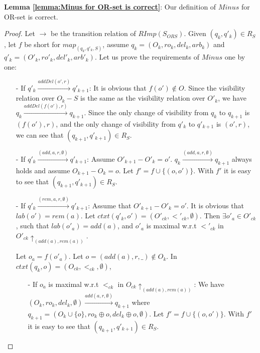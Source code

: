 {\noindent \bf Lemma \ref{lemma:Minus for OR-set is correct}}: Our definition of $Minus$ for OR-set is correct.

\begin {proof}

Let $\rightarrow$ be the transition relation of $RImp(S_{\mathit{ORS}})$. Given $(q_k,q'_k) \in R_{S}$, let $f$ be short for $map_{(q_k,q'_k,S)}$, assume $q_k = (O_k,\mathit{ro}_k,\mathit{del}_k,\mathit{arb}_k)$ and $q'_k = (O'_k,\mathit{ro}'_k,\mathit{del}'_k,\mathit{arb}'_k)$. Let us prove the requirements of $Minus$ one by one:

\begin{itemize}
\setlength{\itemsep}{0.5pt}
\item[-] If $q'_k {\xrightarrow{addDel(o',r)}} q'_{k+1}$: It is obvious that $f(o') \notin O$. Since the visibility relation over $O_k - S$ is the same as the visibility relation over $O'_k$, we have $q_k {\xrightarrow{addDel(f(o'),r)}} q_{k+1}$. Since the only change of visibility from $q_k$ to $q_{k+1}$ is $(f(o'),r)$, and the only change of visibility from $q'_k$ to $q'_{k+1}$ is $(o',r)$, we can see that $(q_{k+1},q'_{k+1}) \in R_{S}$.

\item[-] If $q'_k {\xrightarrow{(add,a,r,\emptyset)}} q'_{k+1}$: Assume $O'_{k+1} - O'_k = o'$. $q_k {\xrightarrow{(add,a,r,\emptyset)}} q_{k+1}$ always holds and assume $O_{k+1} - O_k = o$. Let $f' = f \cup \{ (o,o') \}$. With $f'$ it is easy to see that $(q_{k+1},q'_{k+1}) \in R_{S}$.

\item[-] If $q'_k {\xrightarrow{(rem,a,r,\emptyset)}} q'_{k+1}$: Assume that $O'_{k+1} - O'_k = o'$. It is obvious that $lab(o') = rem(a)$. Let $ctxt(q'_k,o') = (O'_{ck},<'_{ck},\emptyset)$. Then $\exists o'_a \in O'_{ck}$, such that $lab(o'_a) = add(a)$, and $o'_a$ is maximal w.r.t $<'_{ck}$ in $O'_{ck} \uparrow_{ (add(a),rem(a)) }$.

    Let $o_a = f(o'_a)$. Let $o=(add(a),r,\_) \notin O_k$. In $ctxt(q_k,o) = (O_{ck},<_{ck},\emptyset)$,

    \begin{itemize}
    \setlength{\itemsep}{0.5pt}
    \item[-] If $o_a$ is maximal w.r.t $<_{ck}$ in $O_{ck} \uparrow_{ (add(a),rem(a)) }$: We have $(O_k,\mathit{ro}_k,\mathit{del}_k,\emptyset) {\xrightarrow{add(a,r,\emptyset)}} q_{k+1}$ where $q_{k+1} = (O_k \cup \{ o \},\mathit{ro}_k \oplus o , \mathit{del}_k \oplus o,\emptyset)$. Let $f' = f \cup \{ (o,o') \}$. With $f'$ it is easy to see that $(q_{k+1},q'_{k+1}) \in R_{S}$.


\end{itemize}
\end{itemize}
\end{proof}
